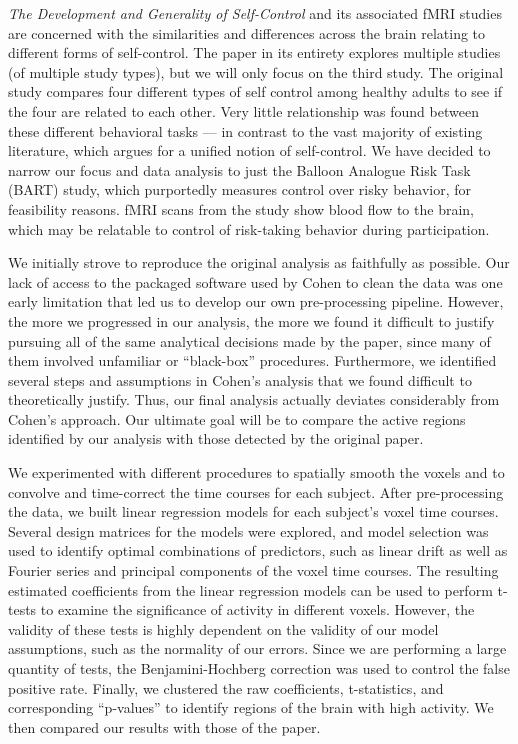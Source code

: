 \par \textit{The Development and Generality of Self-Control} \cite
{CohenSelfControl} and its associated fMRI studies are concerned with the
similarities and differences across the brain relating to different forms of 
self-control. The paper in its entirety explores multiple studies (of 
multiple study types), but we will only focus on the third study. The original 
study compares four different types of self control among healthy adults to 
see if the four are related to each other. Very little relationship was found 
between these different behavioral tasks --- in contrast to the vast majority 
of existing literature,  which argues for a unified notion of self-control. 
We have decided to narrow our focus and data analysis to just the Balloon 
Analogue Risk Task (BART) study, which purportedly measures control over 
risky behavior, for feasibility reasons. fMRI scans from the study show blood 
flow to the brain, which may be relatable to control of risk-taking behavior 
during participation.

\par We initially strove to reproduce the original analysis as faithfully as 
possible. Our lack of access to the packaged software used by Cohen to clean 
the data was one early limitation that led us to develop our own 
pre-processing pipeline. However, the more we progressed in our analysis, 
the more we found it difficult to justify pursuing all of the same analytical 
decisions made by the paper, since many of them involved unfamiliar or 
``black-box'' procedures. Furthermore, we identified several steps and 
assumptions in Cohen's analysis that we found difficult to theoretically 
justify. Thus, our final analysis actually deviates considerably from Cohen's 
approach. Our ultimate goal will be to compare the active regions identified 
by our analysis with those detected by the original paper. 

\par We experimented with different procedures to spatially smooth the voxels 
and to convolve and time-correct the time courses for each subject. After 
pre-processing the data, we built linear regression models for each subject's 
voxel time courses. Several design matrices for the models were explored, and 
model selection was used to identify optimal combinations of predictors, 
such as linear drift as well as Fourier series and principal components of the 
voxel time courses. The resulting estimated coefficients from the linear 
regression models can be used to perform t-tests to examine the significance 
of activity in different voxels. However, the validity of these tests is 
highly dependent on the validity of our model assumptions, such as the 
normality of our errors. Since we are performing a large quantity of tests, 
the Benjamini-Hochberg correction was used to control the false positive rate. 
Finally, we clustered the raw coefficients, t-statistics, and corresponding 
``p-values'' to identify regions of the brain with high activity. We then 
compared our results with those of the paper. 

